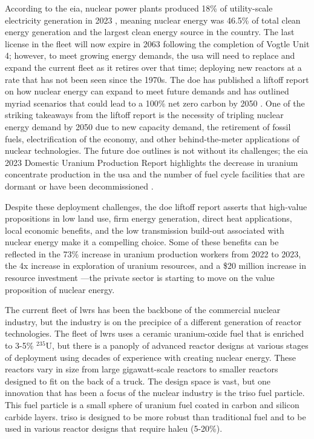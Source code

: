 According to the \gls{eia}, nuclear power plants produced 18\% of utility-scale
electricity generation in 2023 \cite{eia_elec_gen_2024}, meaning nuclear energy
was 46.5\% of total clean energy generation and the largest clean energy source
in the country. The last license in the fleet will now expire in 2063 following
the completion of Vogtle Unit 4; however, to meet growing energy demands,
the \gls{usa} will need to replace and expand the current fleet as it retires
over that time; deploying new reactors at a rate that has not been seen since
the 1970s. The \gls{doe} has published a liftoff report on how nuclear energy
can expand to meet future demands and has outlined myriad scenarios that could
lead to a 100\% net zero carbon by 2050 \cite{julie_liftoff_pathways_2024}. One
of the striking takeaways from the liftoff report is the necessity of tripling
nuclear energy demand by 2050 due to new capacity demand, the retirement of
fossil fuels, electrification of the economy, and other behind-the-meter
applications of nuclear technologies. The future \gls{doe} outlines is not
without its challenges; the \gls{eia} 2023 Domestic Uranium Production Report
highlights the decrease in uranium concentrate production in the \gls{usa} and
the number of fuel cycle facilities that are dormant or have been
decommissioned \cite{eia_uranium_statistics_2023}.

Despite these deployment challenges, the \gls{doe} liftoff report asserts that
high-value propositions in low land use, firm energy generation, direct heat
applications, local economic benefits, and the low transmission build-out
associated with nuclear energy make it a compelling choice. Some of these
benefits can be reflected in the 73\% increase in uranium production workers
from 2022 to 2023, the 4x increase in exploration of uranium resources, and a
\$20 million increase in resource investment \cite{eia_uranium_statistics_2023}
---the private sector is starting to move on the value proposition of nuclear energy.

The current fleet of \glspl{lwr} has been the backbone of the commercial nuclear
industry, but the industry is on the precipice of a different generation of
reactor technologies. The fleet of \glspl{lwr} uses a ceramic uranium-oxide fuel
that is enriched to 3-5\% $^{235}$U, but there is a panoply of advanced reactor
designs at various stages of deployment using decades of
experience with creating nuclear energy. These reactors vary in size from large
gigawatt-scale reactors to smaller reactors designed to fit on the back of a
truck. The design space is vast, but one innovation that has been a focus of
the nuclear industry is the \gls{triso} fuel particle. This fuel particle is a small sphere of uranium fuel coated in carbon and silicon carbide layers. \gls{triso} is designed to be more robust than traditional fuel and to be used in various reactor designs that require \gls{haleu} (5-20\%).

